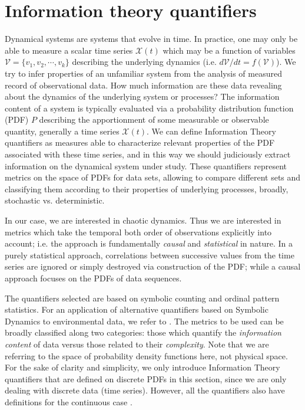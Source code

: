\section{Information theory quantifiers}\label{sec:quanti}

Dynamical systems are systems that evolve in time.
In practice, one may only be able to measure a scalar time series ${\mathcal X}(t)$ which may be a function of variables ${\mathcal V}=\{ v_1, v_2,\cdots, v_k\}$ describing the underlying dynamics (i.e. $d{\mathcal V}/dt=f({\mathcal V})$).
We try to infer properties of an unfamiliar system from the analysis of measured record of observational data. 
How much information are these data revealing about the dynamics of the underlying system or processes?
The information content of a system is typically evaluated via a probability distribution function (PDF) $P$ describing the apportionment of some measurable or observable quantity, generally a time series ${\mathcal X}(t)$. 
We can define Information Theory quantifiers as measures able to characterize relevant properties of the PDF associated with these time series, and in this way we should judiciously extract information on the dynamical system under study.
These quantifiers represent metrics on the space of PDFs for data sets, allowing to compare different sets and classifying them according to their properties of underlying processes, broadly, stochastic vs. deterministic.

In our case, we are interested in chaotic dynamics.
Thus we are interested in metrics which take the temporal both order of observations explicitly into account; i.e. the approach is fundamentally \textit{causal} and \textit{statistical} in nature.
In a purely statistical approach, correlations between successive values from the time series are ignored or simply destroyed via construction of the PDF; while a causal approach focuses on the PDFs of data sequences.

The quantifiers selected are based on symbolic counting and ordinal pattern statistics.
For an application of alternative quantifiers based on Symbolic Dynamics to environmental data, we refer to \cite{Hauhs2008}.
The metrics to be used can be broadly classified along two categories: those which quantify the \textit{information content} of data versus those related to their \textit{complexity}.
Note that we are referring to the space of probability density functions here, not physical space.
For the sake of clarity and simplicity, we only introduce Information Theory quantifiers that are defined on discrete PDFs in this section, since we are only dealing with discrete data (time series).
However, all the quantifiers also have definitions for the continuous case \cite{Shannon1948,Frieden2004} . 

